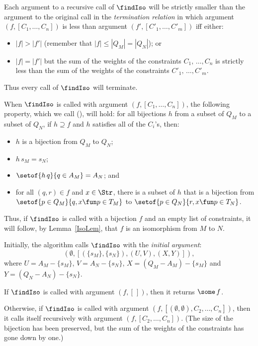 Each argument to a recursive call of $\findIso$ will be strictly
smaller than the argument to the original call in the \emph{termination
relation} in which argument $(f, [C_1,\ldots,C_n])$ is less than argument
$(f', [C'_1,\ldots,C'_m])$ iff either:
\begin{itemize}
\item $|f|>|f'|$ (remember that $|f|\leq|Q_M|=|Q_N|$); or

\item $|f|=|f'|$ but the sum of the weights of the constraints
  $C_1,\,\ldots,C_n$ is strictly less than the sum of the weights of
  the constraints $C'_1, \,\ldots,C'_m$.
\end{itemize}
Thus every call of $\findIso$ will terminate.

When $\findIso$ is called with argument $(f, [C_1,\ldots,C_n])$, the
following property, which we call (\dag), will hold: for all bijections
$h$ from a subset of $Q_M$ to a subset of $Q_N$, if $h\supseteq f$ and $h$
satisfies all of the $C_i$'s, then:
\begin{itemize}
\item $h$ is a bijection from $Q_M$ to $Q_N$;

\item $h\,s_M = s_N$;

\item $\setof{h\,q}{q\in A_M} = A_N$; and

\item for all $(q, r)\in f$ and $x\in\Str$, there is a subset of $h$
  that is a bijection from $\setof{p\in Q_M}{q,x\fun p\in T_M}$ to
  $\setof{p\in Q_N}{r,x\fun p\in T_N}$.
\end{itemize}
Thus, if $\findIso$ is called with a bijection $f$ and an empty list
of constraints, it will follow, by Lemma~\ref{IsoLem},
that $f$ is an isomorphism from $M$ to $N$.

Initially, the algorithm calls $\findIso$ with the \emph{initial argument}:
\begin{displaymath}
(\emptyset, [(\{s_M\}, \{s_N\}), (U, V), (X, Y)]) ,
\end{displaymath}
where $U = A_M - \{s_M\}$, $V = A_N - \{s_N\}$, $X = (Q_M - A_M) -
\{s_M\}$ and $Y= (Q_N - A_N) - \{s_N\}$.

If $\findIso$ is called with argument $(f, [\,])$, then it returns
$\some\,f$.

Otherwise, if $\findIso$ is called with argument $(f, [(\emptyset,
\emptyset), C_2, \ldots, C_n])$, then it calls itself recursively with
argument $(f, [C_2, \ldots, C_n])$.  (The size of the bijection has
been preserved, but the sum of the weights of the constraints has gone
down by one.)

